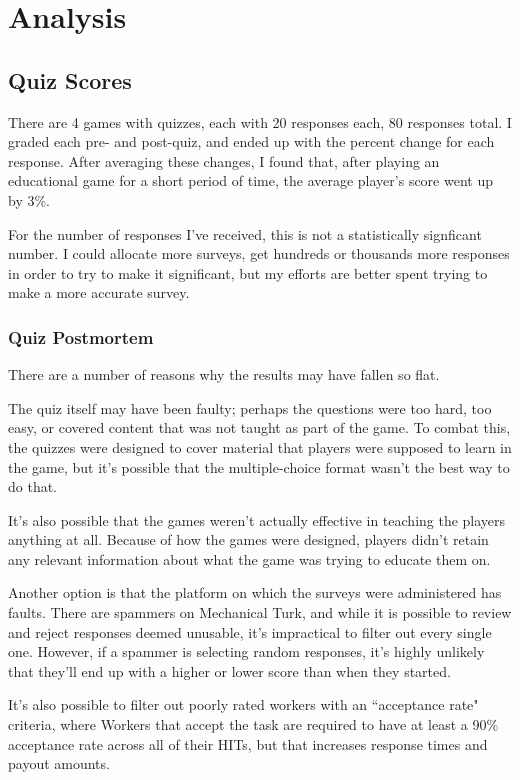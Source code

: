 \section{Analysis}
	\subsection{Quiz Scores}
		There are 4 games with quizzes, each with 20 responses each, 80 responses total. I graded each pre- and post-quiz, and ended up with the percent change for each response. After averaging these changes, I found that, after playing an educational game for a short period of time, the average player's score went up by 3\%.

		For the number of responses I've received, this is not a statistically signficant number. I could allocate more surveys, get hundreds or thousands more responses in order to try to make it significant, but my efforts are better spent trying to make a more accurate survey.

		\subsubsection{Quiz Postmortem}
			There are a number of reasons why the results may have fallen so flat.

			The quiz itself may have been faulty; perhaps the questions were too hard, too easy, or covered content that was not taught as part of the game. To combat this, the quizzes were designed to cover material that players were supposed to learn in the game, but it's possible that the multiple-choice format wasn't the best way to do that.

			It's also possible that the games weren't actually effective in teaching the players anything at all. Because of how the games were designed, players didn't retain any relevant information about what the game was trying to educate them on.

			Another option is that the platform on which the surveys were administered has faults. There are spammers on Mechanical Turk, and while it is possible to review and reject responses deemed unusable, it's impractical to filter out every single one. However, if a spammer is selecting random responses, it's highly unlikely that they'll end up with a higher or lower score than when they started. 

			It's also possible to filter out poorly rated workers with an ``acceptance rate" criteria, where Workers that accept the task are required to have at least a 90\% acceptance rate across all of their HITs, but that increases response times and payout amounts.

